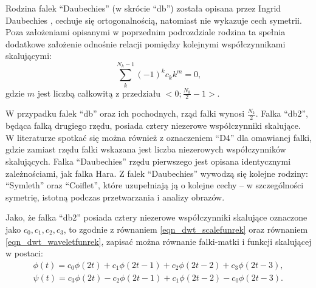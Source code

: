 Rodzina falek \enquote{Daubechies} (w skrócie \enquote{db}) została opisana przez Ingrid Daubechies \cite{vonesch_dbbasics}, cechuje się ortogonalnością, natomiast nie wykazuje cech symetrii. Poza założeniami opisanymi w poprzednim podrozdziale rodzina ta spełnia dodatkowe założenie odnośnie relacji pomiędzy kolejnymi współczynnikami skalującymi:
\begin{equation}
\sum _{k} ^{N_k-1} \left( -1 \right)^{k} c_{k} k^{m} = 0 \label{eqn_db_musthave},
\end{equation}
gdzie $m$ jest liczbą całkowitą z przedziału $<0;\frac{N_k}{2}-1>$.

W przypadku falek \enquote{db} oraz ich pochodnych, rząd falki wynosi $\frac{N_k}{2}$. Falka \enquote{db2}, będąca falką drugiego rzędu, posiada cztery niezerowe współczynniki skalujące. W literaturze spotkać się można również z oznaczeniem \enquote{D4} dla omawianej falki, gdzie zamiast rzędu falki wskazana jest liczba niezerowych współczynników skalujących. Falka \enquote{Daubechies} rzędu pierwszego jest opisana identycznymi zależnościami, jak falka Hara. Z falek \enquote{Daubechies} wywodzą się kolejne rodziny: \enquote{Symleth} oraz \enquote{Coiflet}, które uzupełniają ją o kolejne cechy -- w szczególności symetrię, istotną podczas przetwarzania i analizy obrazów.

Jako, że falka \enquote{db2} posiada cztery niezerowe współczynniki skalujące oznaczone jako $c_0, c_1, c_2, c_3$, to zgodnie z równaniem \eqref{eqn_dwt_scalefunrek} oraz równaniem \eqref{eqn_dwt_waveletfunrek}, zapisać można równanie falki-matki i funkcji skalującej w postaci:
\begin{gather}
\phi \left( t \right) = c_0 \phi \left( 2t \right) + c_1 \phi \left( 2t - 1 \right) + c_2 \phi \left( 2t - 2 \right) + c_3 \phi \left( 2t - 3 \right) \label{eqn_db2_scalefunrek}, \\
\psi \left( t \right) = c_3 \phi \left( 2t \right) - c_2 \phi \left( 2t - 1 \right) + c_1 \phi \left( 2t - 2 \right) - c_0 \phi \left( 2t - 3 \right) \label{eqn_db2_waveletfunrek}.
\end{gather}

